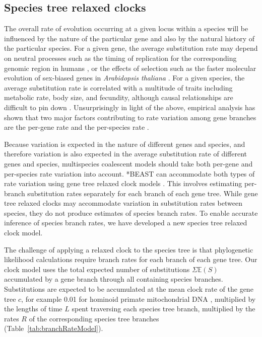 \documentclass[nogrid]{MBE}%
\begin{document}
\subsection{Species tree relaxed clocks}

The overall rate of evolution occurring at a given locus within a species will
be influenced by the nature of the particular gene and also by the natural
history of the particular species. For a given gene, the average substitution
rate may depend on neutral processes such as the timing of replication for the
corresponding genomic region in humans \citep{Stamatoyannopoulos2009}, or the
effects of selection such as the faster molecular evolution of sex-biased genes
in \textit{Arabidopsis thaliana} \citep{Gossmann01032014}. For a given species,
the average substitution rate is correlated with a multitude of traits including
metabolic rate, body size, and fecundity, although causal relationships are
difficult to pin down \citep{Bromham2503}. Unsurprisingly in light of the above, empirical analysis
has shown that two major factors contributing to rate variation among gene
branches are the per-gene rate and the per-species rate
\citep{Rasmussen01122007}.

Because variation is expected in the nature of different genes and species, and
therefore variation is also expected in the average substitution rate of different
genes and species, multispecies coalescent models should take both per-gene and
per-species rate variation into account. *BEAST can accommodate both types of
rate variation using gene tree relaxed clock models \citep[for examples see][]{Berv2014120, Lambert2015146}.
This involves estimating per-branch substitution rates separately
for each branch of each gene tree. While gene tree relaxed clocks may
accommodate variation in substitution rates between species, they do not produce
estimates of species branch rates. To enable accurate inference of species
branch rates, we have developed a new species tree relaxed clock model.

The challenge of applying a relaxed clock to the species tree is that
phylogenetic likelihood calculations require branch rates for each branch of
each gene tree. Our clock model uses the total expected number of substitutions
$\Sigma \mathbb{E}(S)$ accumulated by a gene branch through all containing
species branches. Substitutions are expected to be accumulated at the mean
clock rate of the gene tree $c$, for example 0.01 for hominoid primate
mitochondrial DNA \citep{doi:10.1146/annurev.es.18.110187.001413}, multiplied
by the lengths of time $L$ spent traversing each species tree branch, multiplied
by the rates $R$ of the corresponding species tree branches
(Table~\ref{tab:branchRateModel}).
\end{document}
